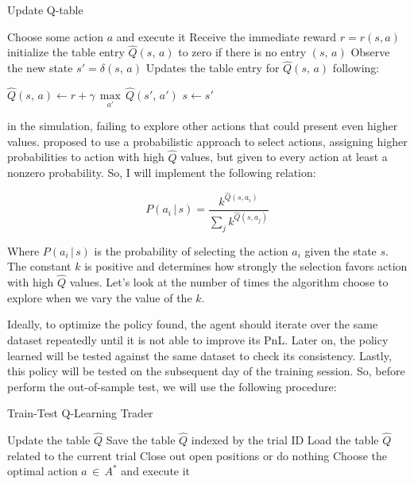 \documentclass[a4paper]{article}
\begin{document}
\begin{algorithm}
\caption{Update Q-table}\label{alg:qtable}
\begin{algorithmic}[1]
  \State Choose some action $a$ and execute it
  \State Receive the immediate reward $r = r(s, a)$
  \State initialize the table entry $\hat{Q}(s, \, a)$ to zero if there is no entry $(s, \, a)$
  \State Observe the new state $s' = \delta(s, \,a)$
  \State Updates the table entry for $\hat{Q}(s, \, a)$ following:

    \do $\hat{Q}(s, \, a) \leftarrow r + \gamma \, \underset{a'}{\max}\, \hat{Q}(s', \, a')$
  \State $s \leftarrow s'$
\EndLoop
\end{algorithmic}
\end{algorithm}

in the simulation, failing to explore other actions that could present even higher values. \cite{Mitchell} proposed to use a probabilistic approach to select actions, assigning higher probabilities to action with high $\hat{Q}$ values, but given to every action at least a nonzero probability. So, I will implement the following relation:

$$P(a_i\, | \,s ) = \frac{k ^{\hat{Q}(s, a_i)}}{\sum_j k^{\hat{Q}(s, a_j)}}$$

Where $P(a_i\, | \,s )$ is the probability of selecting the action $a_i$ given the state $s$. The constant $k$ is positive and determines how strongly the selection favors action with high $\hat{Q}$ values. Let's look at the number of times the algorithm choose to explore when we vary the value of the $k$.

Ideally, to optimize the policy found, the agent should iterate over the same dataset repeatedly until it is not able to improve its PnL. Later on, the policy learned will be tested against the same dataset to check its consistency. Lastly, this policy will be tested on the subsequent day of the training session. So, before perform the out-of-sample test, we will use the following procedure:

\begin{algorithm}
\caption{Train-Test Q-Learning Trader}\label{alg:qtrader}
\begin{algorithmic}[1]
    \State Update the table $\hat{Q}$
  \EndLoop
  \State Save the table $\hat{Q}$ indexed by the trial ID
\EndLoop
{}
  \State Load the table $\hat{Q}$ related to the current trial
      	\State Close out open positions or do nothing
      \Else
        \State Choose the optimal action $a \, \in \, A^{*}$ and execute it
      \EndIf
    \EndLoop
  \EndLoop
\EndLoop
\end{algorithmic}
\end{algorithm}
\end{document}
